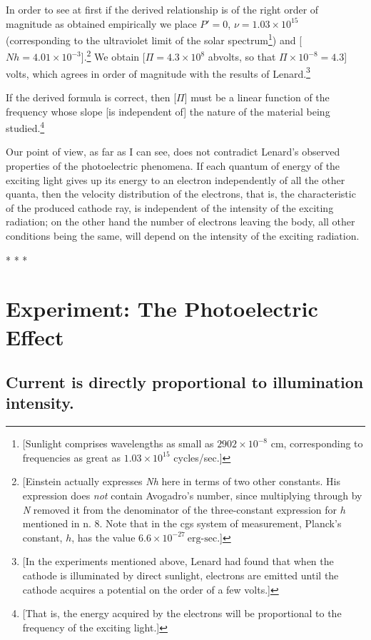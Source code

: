 In order to see at first if the derived relationship is of the right
order of magnitude as obtained empirically we place $P' = 0$,
$\nu = 1.03\!\times\!10^{15}$ (corresponding to the ultraviolet limit of the
solar spectrum\footnote{{[}Sunlight comprises wavelengths as small as
  $2902\!\times\!10^{-8}$ cm, corresponding to frequencies as great as $1.03\!\times\!10^{15}$
  cycles/sec.{]}}) and {[}$Nh = 4.01\!\times\!10^{-3}${]}.\footnote{{[}Einstein
  actually expresses \emph{Nh} here in terms of two other constants. His
  expression does \emph{not} contain Avogadro's number, since
  multiplying through by \emph{N} removed it from the denominator of the
  three-constant expression for $h$ mentioned in n. 8. Note that in the cgs system of 
  measurement, Planck’s constant, $h$, has the value $6.6 \times 10^{-27}\ \text{erg-sec}$.{]}} We
obtain {[}$\Pi = 4.3\!\times\!10^8$ abvolts, so that $\Pi\!\times\!10^{-8} =
4.3${]} volts, which agrees in order of magnitude with the results of
Lenard.\footnote{{[}In the experiments mentioned above, Lenard
  had found that when the cathode is illuminated by direct sunlight,
  electrons are emitted until the cathode acquires a potential on the
  order of a few volts.{]}}

If the derived formula is correct, then {[}$\Pi${]} must be a linear
function of the frequency whose slope {[}is independent of{]} the nature
of the material being studied.\footnote{{[}That is, the energy acquired
  by the electrons will be proportional to the frequency of the exciting
  light.{]}}

Our point of view, as far as I can see, does not contradict Lenard's
observed properties of the photoelectric phenomena. If each quantum of
energy of the exciting light gives up its energy to an electron
independently of all the other quanta, then the velocity distribution of
the electrons, that is, the characteristic of the produced cathode ray,
is independent of the intensity of the exciting radiation; on the other
hand the number of electrons leaving the body, all other conditions
being the same, will depend on the intensity of the exciting 
radiation.\\
\centerline{* * *}

\section*{Experiment: The Photoelectric Effect}

\subsection{Current is directly proportional to illumination intensity.}

